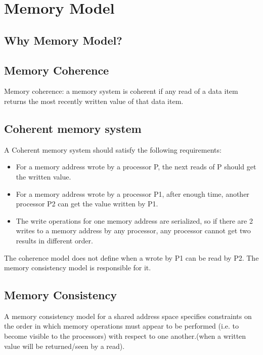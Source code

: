 



\section{Memory Model}

\subsection{Why Memory Model?}



\subsection{Memory Coherence}

Memory coherence: a memory system is coherent if any read of a data item returns the most recently written value of that data item.
\subsection{Coherent memory system}
A Coherent memory system should satisfy the following requirements:
\begin{itemize}
    \item For a memory address wrote by a processor P, the next reads of P should get the written value.
    \item For a memory address wrote by a processor P1, after enough time, another processor P2 can get the value written by P1.
    \item The write operations for one memory address are serialized, so if there are 2 writes to a memory address by any processor, any processor cannot get two results in different order.
\end{itemize}

The coherence model does not define when a wrote by P1 can be read by P2. The memory consistency model is responsible for it.


\subsection{Memory Consistency}

A memory consistency model for a shared address space specifies
 constraints on the order in which memory operations must appear 
 to be performed (i.e. to become visible to the processors) with 
 respect to one another.(when a written value will be returned/seen 
 by a read).

